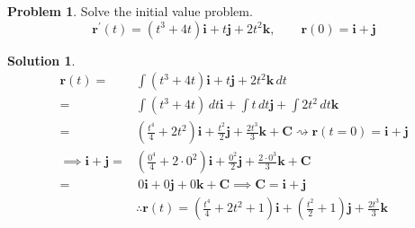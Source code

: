 \documentclass[10pt]{article}
\theoremstyle{definition}
\newtheorem{problem}{Problem}
\newtheorem{soln}{Solution}
\begin{document}
\begin{problem} Solve the initial value problem.
$$\mathbf{r}^\prime(t)=(t^3+4t)\mathbf{i}+t\mathbf{j}+2t^2\mathbf{k},\qquad\mathbf{r}(0)=\mathbf{i}+\mathbf{j}$$
\end{problem}
\begin{soln}
  \begin{align*}
    \mathbf{r}(t) = & \int (t^3+4t)\mathbf{i}+t\mathbf{j}+2t^2\mathbf{k} \,dt\\
    = & \int (t^3+4t)\,dt\mathbf{i}+\int t\,dt\mathbf{j}+\int 2t^2\,dt\mathbf{k} \\
    = & \left(\frac{t^4}{4}+2t^2\right)\mathbf{i}+\frac{t^2}{2}\mathbf{j}+\frac{2t^3}{3}\mathbf{k}+\mathbf{C}\rightsquigarrow \mathbf{r}(t=0)=\mathbf{i}+\mathbf{j}\\
    \implies \mathbf{i}+\mathbf{j} = & \left(\frac{0^4}{4}+2\cdot0^2\right)\mathbf{i}+\frac{0^2}{2}\mathbf{j}+\frac{2\cdot0^3}{3}\mathbf{k}+\mathbf{C} \\
    = & \,0\mathbf{i}+0\mathbf{j}+0\mathbf{k}+\mathbf{C}\implies\mathbf{C}=\mathbf{i}+\mathbf{j} \\
    &\therefore \mathbf{r}(t)=\left(\frac{t^4}{4}+2t^2 + 1\right)\mathbf{i}+\left(\frac{t^2}{2}+1\right)\mathbf{j}+\frac{2t^3}{3}\mathbf{k}
  \end{align*}
\end{soln}
\end{document}
